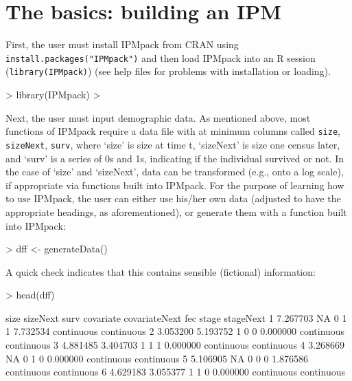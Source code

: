 \documentclass{article}
\begin{document}
\section{The basics: building an IPM}

First, the user must install IPMpack from CRAN using
{\tt install.packages("IPMpack")} and then load IPMpack into an R session
({\tt library(IPMpack)}) (see help files for problems with installation or loading). 

\begin{Schunk}
\begin{Sinput}
> library(IPMpack)
> 
\end{Sinput}
\end{Schunk}
Next, the user must input demographic data. As mentioned above, most functions of IPMpack require a data file with at minimum columns called {\tt size}, {\tt sizeNext}, {\tt surv}, where `size' is size at time t, `sizeNext' is size one census later, and `surv' is a series of 0s and 1s, indicating if the individual survived or not. In the case of `size' and `sizeNext', data can be transformed (e.g., onto a log scale), if appropriate via functions built into IPMpack. For the purpose of learning how to use IPMpack, the user can either use his/her own data (adjusted to have the appropriate headings, as aforementioned), or generate them with a function built into IPMpack:

\begin{Schunk}
\begin{Sinput}
> dff <- generateData()
\end{Sinput}
\end{Schunk}
A quick check indicates that this contains sensible (fictional) information: 
\begin{Schunk}
\begin{Sinput}
> head(dff)
\end{Sinput}
\begin{Soutput}
      size sizeNext surv covariate covariateNext      fec      stage  stageNext
1 7.267703       NA    0         1             1 7.732534 continuous continuous
2 3.053200 5.193752    1         0             0 0.000000 continuous continuous
3 4.881485 3.404703    1         1             1 0.000000 continuous continuous
4 3.268669       NA    0         1             0 0.000000 continuous continuous
5 5.106905       NA    0         0             0 1.876586 continuous continuous
6 4.629183 3.055377    1         1             0 0.000000 continuous continuous
\end{Soutput}
\end{Schunk}
\end{document}
